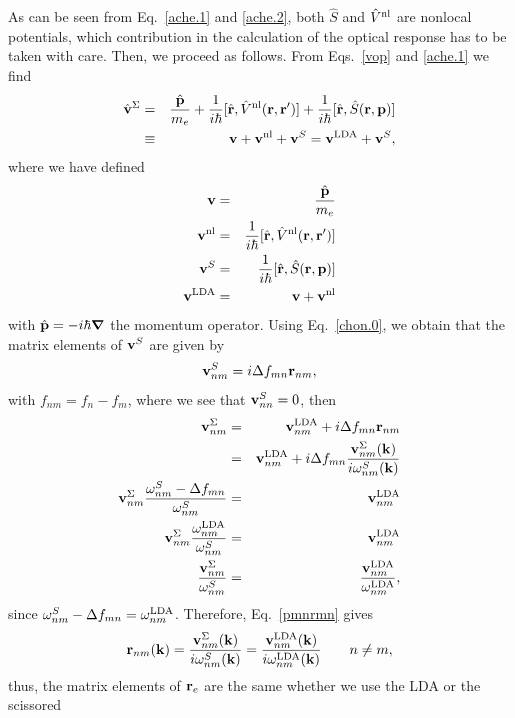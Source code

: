 \documentclass[floatfix,prb,aps,superscriptaddress,11pt,preprint]{revtex4}
\begin{document}
As can be seen from Eq.~\eqref{ache.1} and \eqref{ache.2},
both $\hat S$ and $\hat V^{\mathrm{nl}}$ are nonlocal potentials, which contribution 
in the calculation of the optical response has to be taken with care.
Then, we proceed as follows. From Eqs.~\eqref{vop} and \eqref{ache.1} we find
\begin{eqnarray}\label{vop2}
\hat{\mathbf{v}}^\Sigma&=&
\frac{\hat{\mathbf{p}}}{m_e}
+
\frac{1}{i\hbar}[\hat{\mathbf{r}},\hat V^{\mathrm{nl}}(\mathbf{r},\mathbf{r}')]
+
\frac{1}{i\hbar}[\hat{\mathbf{r}},\hat S(\mathbf{r},\mathbf{p})]
\nonumber\\
&\equiv&
\mathbf{v}
+
\mathbf{v}^{\mathrm{nl}}
+\mathbf{v}^S
=
\mathbf{v}^{\mathrm{LDA}}
+\mathbf{v}^S
,
\end{eqnarray}
where we have defined
\begin{eqnarray}\label{conhr}
\mathbf{v}
&=&\frac{\hat{\mathbf{p}}}{m_e}
\nonumber\\
\mathbf{v}^{\mathrm{nl}}
&=&
\frac{1}{i\hbar}[\hat{\mathbf{r}},\hat V^{\mathrm{nl}}(\mathbf{r},\mathbf{r}')]
\nonumber\\
\mathbf{v}^S
&=&
\frac{1}{i\hbar}[\hat{\mathbf{r}},\hat S(\mathbf{r},\mathbf{p})]
\nonumber\\
\mathbf{v}^{\mathrm{LDA}}
&=&
\mathbf{v}
+\mathbf{v}^{\mathrm{nl}}
\end{eqnarray}  
with $\hat{\mathbf{p}}=-i\hbar\boldsymbol{\nabla}$ the momentum operator.
Using Eq.~\eqref{chon.0}, we obtain that the
matrix elements of $\mathbf{v}^S$ are given by
\begin{equation}\label{chon.2} 
\mathbf{v}^S_{nm}=i\Delta f_{mn}\mathbf{r}_{nm},
\end{equation}
with $f_{nm}=f_n-f_m$,
where we see that $\mathbf{v}^S_{nn}=0$, then
\begin{eqnarray}\label{chon.8}
\mathbf{v}^\Sigma_{nm}
&=&
\mathbf{v}^{\mathrm{LDA}}_{nm}+i\Delta f_{mn}\mathbf{r}_{nm}
\nonumber\\
&=&
\mathbf{v}^{\mathrm{LDA}}_{nm}+i\Delta f_{mn}\frac{\mathbf{v}^\Sigma_{nm}(\mathbf{k})}{i\omega^S_{nm}(\mathbf{k})}
\nonumber\\
\mathbf{v}^\Sigma_{nm}
\frac{\omega^S_{nm}-\Delta f_{mn}}{\omega^S_{nm}}
&=&
\mathbf{v}^{\mathrm{LDA}}_{nm}
\nonumber\\
\mathbf{v}^\Sigma_{nm}
\frac{\omega^{\mathrm{LDA}}_{nm}}{\omega^S_{nm}}
&=&
\mathbf{v}^{\mathrm{LDA}}_{nm}
\nonumber\\
\frac{\mathbf{v}^\Sigma_{nm}}{\omega^S_{nm}}
&=&
\frac{\mathbf{v}^{\mathrm{LDA}}_{nm}}{\omega^{\mathrm{LDA}}_{nm}}
,
\end{eqnarray}
since
$\omega^S_{nm}-\Delta f_{mn}=\omega^{\mathrm{LDA}}_{nm}$. Therefore, 
Eq.~\eqref{pmnrmn} gives
\begin{eqnarray}\label{chon.10}
\mathbf{r}_{nm}(\mathbf{k})
=
\frac{\mathbf{v}^\Sigma_{nm}(\mathbf{k})}{i\omega^S_{nm}(\mathbf{k})}
=
\frac{\mathbf{v}^{\mathrm{LDA}}_{nm}(\mathbf{k})}{i\omega^{\mathrm{LDA}}_{nm}(\mathbf{k})}
\quad\quad n\ne m
,
\end{eqnarray}
thus,
the matrix elements
of $\mathbf{r}_e$ are the same whether we use the LDA or the scissored
\end{document}
